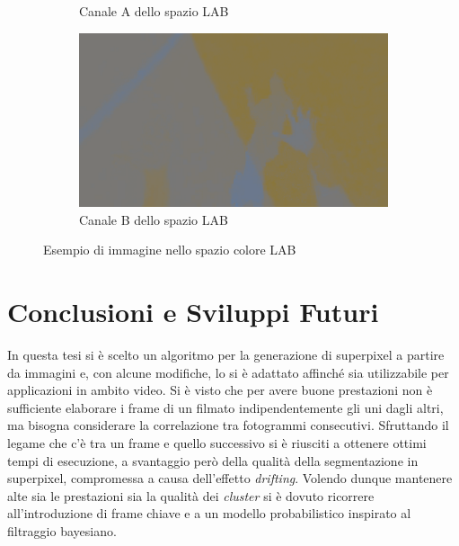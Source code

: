 \documentclass[12pt,a4paper,oneside]{article}
\begin{document}
\begin{figure}[!htb]
\begin{subfigure}[t]{.495\textwidth}
		\caption{Canale A dello spazio \mbox{LAB}}\label{es_LAB_A}
	\end{subfigure}%
	\hfill
	\begin{subfigure}[t]{.495\textwidth}
		\includegraphics[width=\textwidth]{resources/images/es_LAB_B.png}
		\caption{Canale B dello spazio \mbox{LAB}}\label{es_LAB_B}
	\end{subfigure}%
	\caption{Esempio di immagine nello spazio colore \mbox{LAB}}\label{es_LAB}
\end{figure}
\newpage





\section{Conclusioni e Sviluppi Futuri}\label{Conclusioni}


In questa tesi si è scelto un algoritmo \cite{ACHANTA_SLIC} per la generazione di superpixel a partire da immagini e, con alcune modifiche, lo si è adattato affinché sia utilizzabile per applicazioni in ambito video. Si è visto che per avere buone prestazioni non è sufficiente elaborare i frame di un filmato indipendentemente gli uni dagli altri, ma bisogna considerare la correlazione tra fotogrammi consecutivi.
Sfruttando il legame che c'è tra un frame e quello successivo si è riusciti a ottenere ottimi tempi di esecuzione, a svantaggio però della qualità della segmentazione in superpixel, compromessa a causa dell'effetto \textit{drifting}. Volendo dunque mantenere alte sia le prestazioni sia la qualità dei \textit{cluster} si è dovuto ricorrere all'introduzione di frame chiave e a un modello probabilistico inspirato al filtraggio bayesiano.
\end{document}
